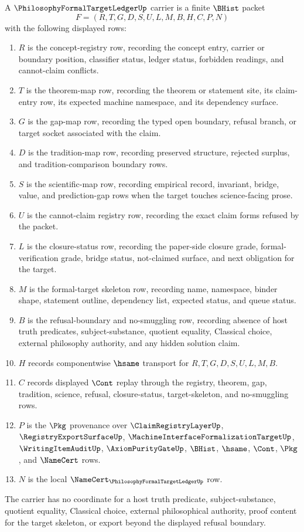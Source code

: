 \begin{definition}
\label{def:philosophy-formal-target-ledger-carrier}
A $\PhilosophyFormalTargetLedgerUp$ carrier is a finite $\BHist$ packet
$$
F=(R,T,G,D,S,U,L,M,B,H,C,P,N)
$$
with the following displayed rows:
\begin{enumerate}
\item $R$ is the concept-registry row, recording the concept entry, carrier or boundary position, classifier status, ledger status, forbidden readings, and cannot-claim conflicts.
\item $T$ is the theorem-map row, recording the theorem or statement site, its claim-entry row, its expected machine namespace, and its dependency surface.
\item $G$ is the gap-map row, recording the typed open boundary, refusal branch, or target socket associated with the claim.
\item $D$ is the tradition-map row, recording preserved structure, rejected surplus, and tradition-comparison boundary rows.
\item $S$ is the scientific-map row, recording empirical record, invariant, bridge, value, and prediction-gap rows when the target touches science-facing prose.
\item $U$ is the cannot-claim registry row, recording the exact claim forms refused by the packet.
\item $L$ is the closure-status row, recording the paper-side closure grade, formal-verification grade, bridge status, not-claimed surface, and next obligation for the target.
\item $M$ is the formal-target skeleton row, recording name, namespace, binder shape, statement outline, dependency list, expected status, and queue status.
\item $B$ is the refusal-boundary and no-smuggling row, recording absence of host truth predicates, subject-substance, quotient equality, Classical choice, external philosophy authority, and any hidden solution claim.
\item $H$ records componentwise $\hsame$ transport for $R,T,G,D,S,U,L,M,B$.
\item $C$ records displayed $\Cont$ replay through the registry, theorem, gap, tradition, science, refusal, closure-status, target-skeleton, and no-smuggling rows.
\item $P$ is the $\Pkg$ provenance over $\ClaimRegistryLayerUp$, $\RegistryExportSurfaceUp$, $\MachineInterfaceFormalizationTargetUp$, $\WritingItemAuditUp$, $\AxiomPurityGateUp$, $\BHist$, $\hsame$, $\Cont$, $\Pkg$, and $\NameCert$ rows.
\item $N$ is the local $\NameCert_{\PhilosophyFormalTargetLedgerUp}$ row.
\end{enumerate}
The carrier has no coordinate for a host truth predicate, subject-substance, quotient equality, Classical choice, external philosophical authority, proof content for the target skeleton, or export beyond the displayed refusal boundary.
\end{definition}
